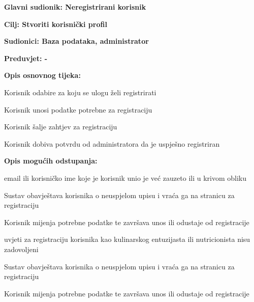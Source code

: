 					\noindent {}
					\begin{packed_item}
	
						\item \textbf{Glavni sudionik: Neregistrirani korisnik}
						\item  \textbf{Cilj: Stvoriti korisnički profil}
						\item  \textbf{Sudionici: Baza podataka, administrator}
						\item  \textbf{Preduvjet: - } 
						\item  \textbf{Opis osnovnog tijeka:}
						
						\item[] \begin{packed_enum}
	
							\item Korisnik odabire za koju se ulogu želi registrirati
							\item Korisnik unosi podatke potrebne za registraciju
							\item Korisnik šalje zahtjev za registraciju
							\item Korisnik dobiva potvrdu od administratora da je uspješno registriran
						\end{packed_enum}
						
						\item  \textbf{Opis mogućih odstupanja:}
						
						\item[] \begin{packed_item}
	
							\item[2.a] email ili korisničko ime koje je korisnik unio je već zauzeto ili u krivom obliku
							\item[] \begin{packed_enum}
								
								\item Sustav obavještava korisnika o neuspjelom upisu i vraća ga na stranicu za registraciju
								\item Korisnik mijenja potrebne podatke te završava unos ili odustaje od
registracije		
							\end{packed_enum}
							
							\item[3.a] uvjeti za registraciju korisnika kao kulinarskog entuzijasta ili nutricionista nisu zadovoljeni
							\item[] \begin{packed_enum}
								
								\item Sustav obavještava korisnika o neuspjelom upisu i vraća ga na stranicu za registraciju
								\item Korisnik mijenja potrebne podatke te završava unos ili odustaje od registracije		
							\end{packed_enum}	
						\end{packed_item}
					\end{packed_item}
					
